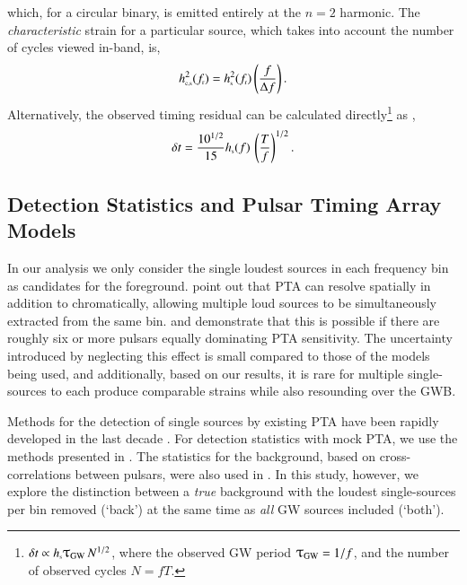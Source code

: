 \documentclass[useAMS, usenatbib]{mnras}  %
\newcommand{\frest}{f_\trt{r}}
\newcommand{\hs}{h_\trt{s}}
\newcommand{\hcs}{h_\trt{c,s}}
\newcommand{\bigt}{\scalebox{1.2}{\ensuremath{\uptau}}}
\newcommand{\tgw}{\bigt_\tr{GW}}
\begin{document}
        which, for a circular binary, is emitted entirely at the $n=2$ harmonic.  The \textit{characteristic} strain for a particular source, which takes into account the number of cycles viewed in-band, is,
        \begin{equation}
        \label{eq:source_char_strain}
        \hcs^2(\frest) = \hs^2(\frest) \left(\frac{f}{\Delta f}\right).
        \end{equation}
        Alternatively, the observed timing residual can be calculated directly\footnote{$\delta t \propto \hs \tgw \, N^{1/2}$, where the observed GW period $\tgw = 1/f$, and the number of observed cycles $N = f T$.} as \citep{sesana2009},
        \begin{equation}
        \label{eq:residuals}
        \delta t = \frac{10^{1/2}}{15} \hs(f) \, \left(\frac{T}{f}\right)^{1/2}.
        \end{equation}

    \subsection{Detection Statistics and Pulsar Timing Array Models}
        \label{sec:meth_ds}

        In our analysis we only consider the single loudest sources in each frequency bin as candidates for the foreground.  \citet{ravi2012} point out that PTA can resolve spatially in addition to chromatically, allowing multiple loud sources to be simultaneously extracted from the same bin.  \citet{boyle2012} and \citet{babak2012} demonstrate that this is possible if there are roughly six or more pulsars equally dominating PTA sensitivity.  The uncertainty introduced by neglecting this effect is small compared to those of the models being used, and additionally, based on our results, it is rare for multiple single-sources to each produce comparable strains while also resounding over the GWB.

        Methods for the detection of single sources by existing PTA have been rapidly developed in the last decade \citep[e.g.][]{corbin2010, lee201103, boyle2012, babak2012, ellis201204, ellis2013, taylor201406, zhu201502, zhu201606, taylor201505}.  For detection statistics with mock PTA, we use the methods presented in \citet[][hereafter, ]{rsg15}.  The statistics for the background, based on cross-correlations between pulsars, were also used in \citet{paper2}.  In this study, however, we explore the distinction between a \textit{true} background with the loudest single-sources per bin removed (`back') at the same time as \textit{all} GW sources included (`both').
\end{document}
